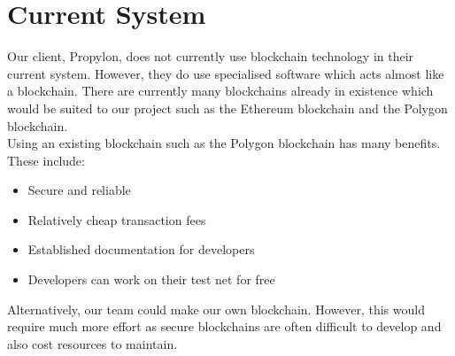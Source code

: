 \section{Current System}
Our client, Propylon, does not currently use blockchain technology in their current system.
However, they do use specialised software which acts almost like a blockchain. 
There are currently many blockchains already in existence which would be suited to our project such as the Ethereum blockchain 
and the Polygon blockchain. \\

\noindent
Using an existing blockchain such as the Polygon blockchain has many benefits. These include: 

\begin{itemize}
    \item Secure and reliable 
    \item Relatively cheap transaction fees 
    \item Established documentation for developers
    \item Developers can work on their test net for free 
\end{itemize}

\noindent
Alternatively, our team could make our own blockchain. 
However, this would require much more effort as secure blockchains are often difficult to develop and also cost resources to maintain. 

